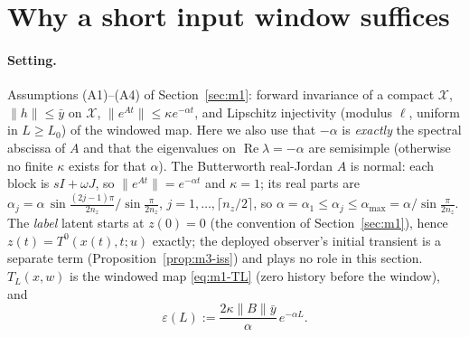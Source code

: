 \section{Why a short input window suffices}\label{sec:m2}

\paragraph{Setting.} Assumptions (A1)--(A4) of Section~\ref{sec:m1}: forward invariance of a compact
$\mathcal X$, $\|h\|\le\bar y$ on $\mathcal X$, $\|e^{At}\|\le\kappa e^{-\alpha t}$, and Lipschitz injectivity
(modulus $\ell$, uniform in $L\ge L_0$) of the windowed map. Here we also use that $-\alpha$ is \emph{exactly} the
spectral abscissa of $A$ and that the eigenvalues on $\operatorname{Re}\lambda=-\alpha$ are semisimple (otherwise no
finite $\kappa$ exists for that $\alpha$). The Butterworth real-Jordan $A$ is normal: each block is $sI+\omega J$,
so $\|e^{At}\|=e^{-\alpha t}$ and $\kappa=1$; its real parts are
$\alpha_j=\alpha\,\sin\frac{(2j-1)\pi}{2n_z}/\sin\frac{\pi}{2n_z}$, $j=1,\dots,\lceil n_z/2\rceil$, so
$\alpha=\alpha_1\le\alpha_j\le\alpha_{\max}=\alpha/\sin\frac{\pi}{2n_z}$. The \emph{label} latent starts at
$z(0)=0$ (the convention of Section~\ref{sec:m1}), hence $z(t)=T^0(x(t),t;u)$ exactly; the deployed observer's
initial transient is a separate term (Proposition~\ref{prop:m3-iss}) and plays no role in this section.
$T_L(x,w)$ is the windowed map \eqref{eq:m1-TL} (zero history before the window), and
\[
 \varepsilon(L):=\frac{2\kappa\|B\|\bar y}{\alpha}\,e^{-\alpha L}.
\]

